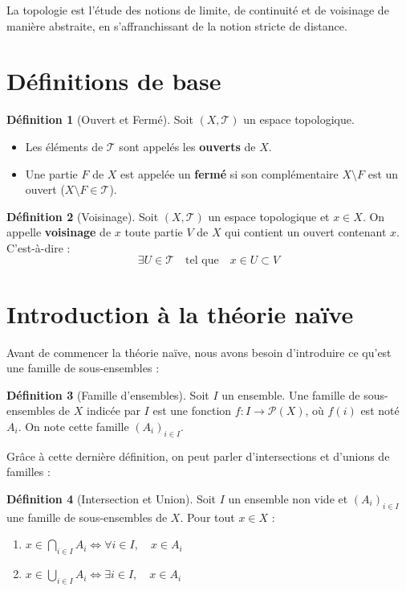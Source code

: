 \documentclass[12pt, a4paper]{report}
\theoremstyle{definition}
\newtheorem{definition}{Définition}[chapter]
\begin{document}
La topologie est l'étude des notions de limite, de continuité et de voisinage de manière abstraite, en s'affranchissant de la notion stricte de distance.

\section{Définitions de base}

\begin{definition}[Ouvert et Fermé]
Soit $(X, \mathcal{T})$ un espace topologique.
\begin{itemize}
    \item Les éléments de $\mathcal{T}$ sont appelés les \textbf{ouverts} de $X$.
    \item Une partie $F$ de $X$ est appelée un \textbf{fermé} si son complémentaire $X \setminus F$ est un ouvert ($X \setminus F \in \mathcal{T}$).
\end{itemize}
\end{definition}

\begin{definition}[Voisinage]
Soit $(X, \mathcal{T})$ un espace topologique et $x \in X$. On appelle \textbf{voisinage} de $x$ toute partie $V$ de $X$ qui contient un ouvert contenant $x$. C'est-à-dire :
\[ \exists U \in \mathcal{T} \quad \text{tel que} \quad x \in U \subset V \]
\end{definition}

\section{Introduction à la théorie naïve}
Avant de commencer la théorie naïve, nous avons besoin d'introduire ce qu'est une famille de sous-ensembles :
\begin{definition}[Famille d'ensembles]
Soit $I$ un ensemble. Une famille de sous-ensembles de $X$ indicée par $I$ est une fonction $f : I \to \mathcal{P}(X)$, où $f(i)$ est noté $A_i$. On note cette famille $(A_i)_{i \in I}$.
\end{definition}

Grâce à cette dernière définition, on peut parler d'intersections et d'unions de familles :
\begin{definition}[Intersection et Union]
Soit $I$ un ensemble non vide et $(A_i)_{i \in I}$ une famille de sous-ensembles de $X$. Pour tout $x \in X$ :
\begin{enumerate}
    \item $x \in \bigcap_{i \in I} A_i \iff \forall i \in I, \quad x \in A_i$
    \item $x \in \bigcup_{i \in I} A_i \iff \exists i \in I, \quad x \in A_i$
\end{enumerate}
\end{definition}
\end{document}
